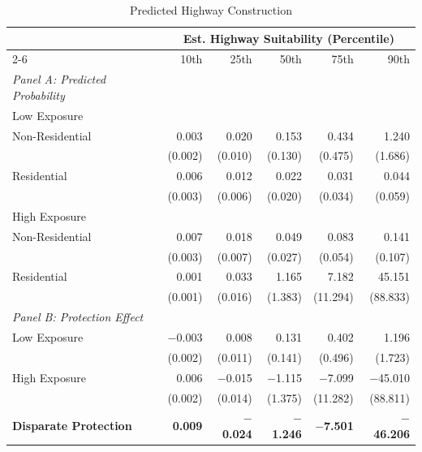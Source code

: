 \begin{table}[h]
\centering
\caption{Predicted Highway Construction }
\label{tab:predicted_outcomes/black_share_sweep_logitinteraction}
\begin{threeparttable}
\begin{tabular*}{1\textwidth}{@{\extracolsep{\fill}}lr@{\hspace{1.2em}}r@{\hspace{1.2em}}r@{\hspace{1.2em}}r@{\hspace{1.2em}}r@{\hspace{1.2em}}}
\toprule
 & \multicolumn{5}{c}{Est. Highway Suitability (Percentile)} \\
\cmidrule(l){2-6}
 & 10th & 25th & 50th & 75th & 90th \\
\midrule
\textit{Panel A: Predicted Probability} & & & & & \\
\addlinespace[2pt]
Low Exposure & & & & & \\
\quad Non-Residential & 0.003 & 0.020 & 0.153 & 0.434 & 1.240 \\
 & (0.002) & (0.010) & (0.130) & (0.475) & (1.686) \\[4pt]
\quad Residential & 0.006 & 0.012 & 0.022 & 0.031 & 0.044 \\
 & (0.003) & (0.006) & (0.020) & (0.034) & (0.059) \\[4pt]
High Exposure & & & & & \\
\quad Non-Residential & 0.007 & 0.018 & 0.049 & 0.083 & 0.141 \\
 & (0.003) & (0.007) & (0.027) & (0.054) & (0.107) \\[4pt]
\quad Residential & 0.001 & 0.033 & 1.165 & 7.182 & 45.151 \\
 & (0.001) & (0.016) & (1.383) & (11.294) & (88.833) \\[4pt]
\midrule
\textit{Panel B: Protection Effect} & & & & & \\
\addlinespace[2pt]
Low Exposure & $-$0.003 & 0.008 & 0.131 & 0.402 & 1.196 \\
 & (0.002) & (0.011) & (0.141) & (0.496) & (1.723) \\[4pt]
High Exposure & 0.006\rlap{$^{**}$} & $-$0.015 & $-$1.115 & $-$7.099 & $-$45.010 \\
 & (0.002) & (0.014) & (1.375) & (11.282) & (88.811) \\[4pt]
\addlinespace[2pt]
\textbf{Disparate Protection} & \textbf{0.009}\rlap{$^{***}$} & \textbf{$-$0.024} & \textbf{$-$1.246} & \textbf{$-$7.501} & \textbf{$-$46.206} \\

\end{tabular*}
\end{threeparttable}
\end{table}

